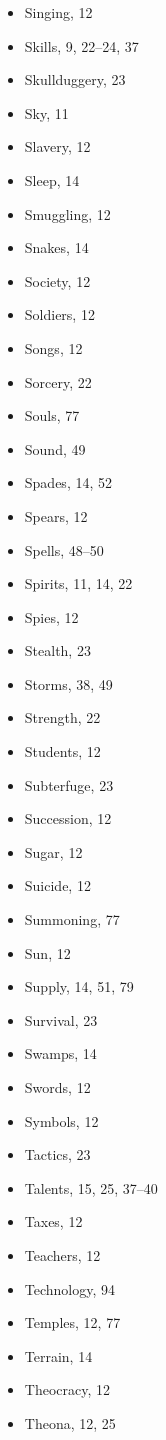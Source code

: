 \begin{multicols}{2}
\begin{itemize}
  \item Singing, 12
  \item Skills, 9, 22--24, 37
  \item Skullduggery, 23
  \item Sky, 11
  \item Slavery, 12
  \item Sleep, 14
  \item Smuggling, 12
  \item Snakes, 14
  \item Society, 12
  \item Soldiers, 12
  \item Songs, 12
  \item Sorcery, 22
  \item Souls, 77
  \item Sound, 49
  \item Spades, 14, 52
  \item Spears, 12
  \item Spells, 48--50
  \item Spirits, 11, 14, 22
  \item Spies, 12
  \item Stealth, 23
  \item Storms, 38, 49
  \item Strength, 22
  \item Students, 12
  \item Subterfuge, 23
  \item Succession, 12
  \item Sugar, 12
  \item Suicide, 12
  \item Summoning, 77
  \item Sun, 12
  \item Supply, 14, 51, 79
  \item Survival, 23
  \item Swamps, 14
  \item Swords, 12
  \item Symbols, 12
  \item Tactics, 23
  \item Talents, 15, 25, 37--40
  \item Taxes, 12
  \item Teachers, 12
  \item Technology, 94
  \item Temples, 12, 77
  \item Terrain, 14
  \item Theocracy, 12
  \item Theona, 12, 25

\end{itemize}
\end{multicols}
